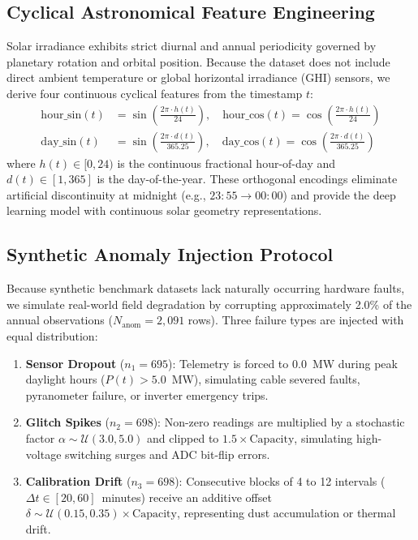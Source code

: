 \documentclass[conference]{IEEEtran}
\begin{document}
\subsection{Cyclical Astronomical Feature Engineering}
Solar irradiance exhibits strict diurnal and annual periodicity governed by planetary rotation and orbital position. Because the dataset does not include direct ambient temperature or global horizontal irradiance (GHI) sensors, we derive four continuous cyclical features from the timestamp $t$:
\begin{align}
\text{hour\_sin}(t) &= \sin\!\left(\frac{2\pi \cdot h(t)}{24}\right), \quad
\text{hour\_cos}(t) = \cos\!\left(\frac{2\pi \cdot h(t)}{24}\right) \\
\text{day\_sin}(t) &= \sin\!\left(\frac{2\pi \cdot d(t)}{365.25}\right), \quad
\text{day\_cos}(t) = \cos\!\left(\frac{2\pi \cdot d(t)}{365.25}\right)
\end{align}
where $h(t) \in [0, 24)$ is the continuous fractional hour-of-day and $d(t) \in [1, 365]$ is the day-of-the-year. These orthogonal encodings eliminate artificial discontinuity at midnight (e.g., $23{:}55 \to 00{:}00$) and provide the deep learning model with continuous solar geometry representations.

\subsection{Synthetic Anomaly Injection Protocol}
Because synthetic benchmark datasets lack naturally occurring hardware faults, we simulate real-world field degradation by corrupting approximately 2.0\% of the annual observations ($N_{\text{anom}} = 2{,}091$ rows). Three failure types are injected with equal distribution:
\begin{enumerate}
    \item \textbf{Sensor Dropout} ($n_1 = 695$): Telemetry is forced to $0.0$~MW during peak daylight hours ($P(t) > 5.0$~MW), simulating cable severed faults, pyranometer failure, or inverter emergency trips.
    \item \textbf{Glitch Spikes} ($n_2 = 698$): Non-zero readings are multiplied by a stochastic factor $\alpha \sim \mathcal{U}(3.0, 5.0)$ and clipped to $1.5 \times \text{Capacity}$, simulating high-voltage switching surges and ADC bit-flip errors.
    \item \textbf{Calibration Drift} ($n_3 = 698$): Consecutive blocks of 4 to 12 intervals ($\Delta t \in [20, 60]$~minutes) receive an additive offset $\delta \sim \mathcal{U}(0.15, 0.35) \times \text{Capacity}$, representing dust accumulation or thermal drift.
\end{enumerate}
\end{document}
